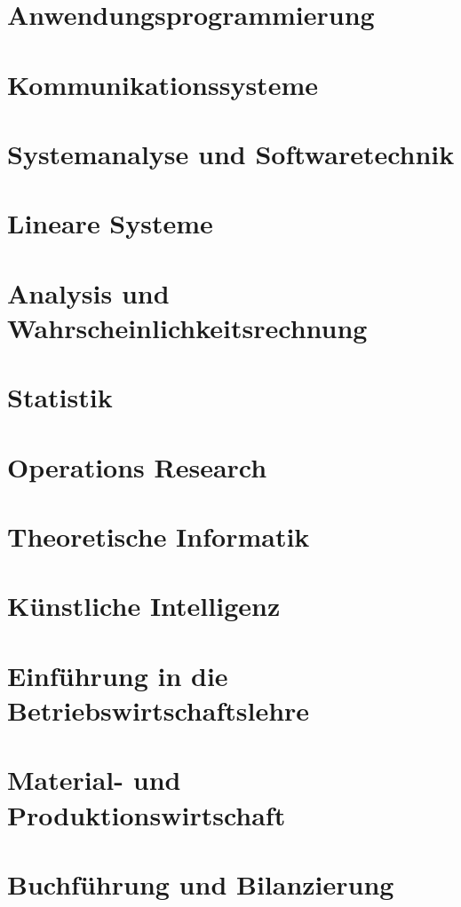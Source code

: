 \documentclass{hswbook}
\begin{document}
    \chapter{Anwendungsprogrammierung}\label{chap:awp}
    \chapter{Kommunikationssysteme}\label{chap:komsys}
    \chapter{Systemanalyse und Softwaretechnik}\label{chap:swt}
    \chapter{Lineare Systeme}\label{chap:mathe1}
    \chapter{Analysis und Wahrscheinlichkeitsrechnung}\label{chap:mathe2}
    \chapter{Statistik}\label{chap:statistik}
    \chapter{Operations Research}\label{chap:or}
    \chapter{Theoretische Informatik}\label{chap:ti}
    \chapter{Künstliche Intelligenz}\label{chap:ki}
    \chapter{Einführung in die Betriebswirtschaftslehre}\label{chap:bwl}
    \chapter{Material- und Produktionswirtschaft}\label{chap:mup}
    \chapter{Buchführung und Bilanzierung}\label{chap:fibu}
\end{document}
